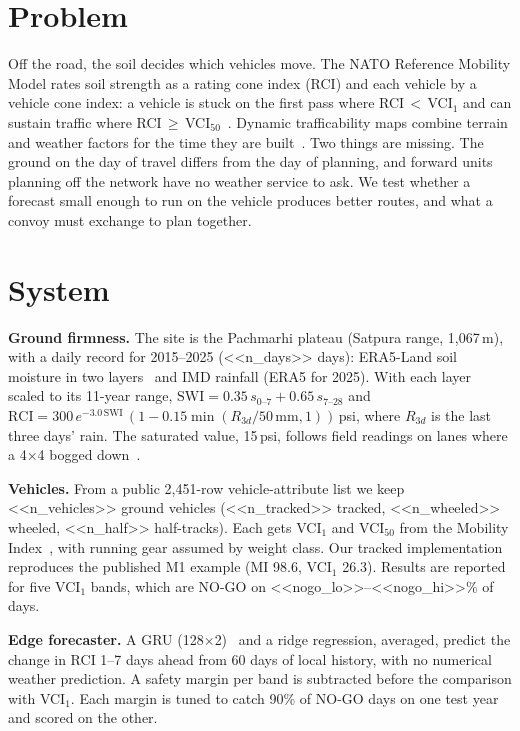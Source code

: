 \documentclass[sigconf]{acmart}
\begin{document}
\section{Problem}
Off the road, the soil decides which vehicles move. The NATO Reference Mobility Model
rates soil strength as a rating cone index (RCI) and each vehicle by a vehicle cone index:
a vehicle is stuck on the first pass where RCI\,$<$\,VCI$_1$ and can sustain traffic where
RCI\,$\geq$\,VCI$_{50}$~\cite{rosca2018}. Dynamic trafficability maps combine terrain and
weather factors for the time they are built~\cite{liu2025}. Two things are missing. The
ground on the day of travel differs from the day of planning, and forward units planning
off the network have no weather service to ask. We test whether a forecast small enough to
run on the vehicle produces better routes, and what a convoy must exchange to plan together.

\section{System}
\textbf{Ground firmness.} The site is the Pachmarhi plateau (Satpura range, 1,067\,m), with
a daily record for 2015--2025 (<<n_days>> days): ERA5-Land soil moisture in two
layers~\cite{munoz2021} and IMD rainfall (ERA5 for 2025). With each layer scaled to its 11-year range,
$\mathrm{SWI}=0.35\,s_{0\text{--}7}+0.65\,s_{7\text{--}28}$ and
$\mathrm{RCI}=300\,e^{-3.0\,\mathrm{SWI}}\,(1-0.15\min(R_{3d}/50\,\mathrm{mm},1))$\,psi, where
$R_{3d}$ is the last three days' rain. The saturated value, 15\,psi, follows field readings
on lanes where a 4$\times$4 bogged down~\cite{rosca2018}.

\textbf{Vehicles.} From a public 2,451-row vehicle-attribute list we keep <<n_vehicles>> ground
vehicles (<<n_tracked>> tracked, <<n_wheeled>> wheeled, <<n_half>> half-tracks). Each gets VCI$_1$
and VCI$_{50}$ from the Mobility Index~\cite{rosca2018,ciobotaru2009}, with running gear
assumed by weight class. Our tracked implementation reproduces the published M1 example
(MI 98.6, VCI$_1$ 26.3). Results are reported for five VCI$_1$ bands, which are NO-GO on
<<nogo_lo>>--<<nogo_hi>>\% of days.

\textbf{Edge forecaster.} A GRU (128$\times$2)~\cite{cho2014} and a ridge regression,
averaged, predict the change in RCI 1--7 days ahead from 60 days of local history, with no
numerical weather prediction. A safety margin per band is subtracted before the comparison
with VCI$_1$. Each margin is tuned to catch 90\% of NO-GO days on one test year and scored
on the other.
\end{document}
